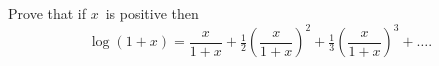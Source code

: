 Prove that if $x$~is positive then
\[
\log(1 + x) = \frac{x}{1 + x}
  + \tfrac{1}{2} \left(\frac{x}{1 + x}\right)^{2}
  + \tfrac{1}{3} \left(\frac{x}{1 + x}\right)^{3} + \dots.
\]

